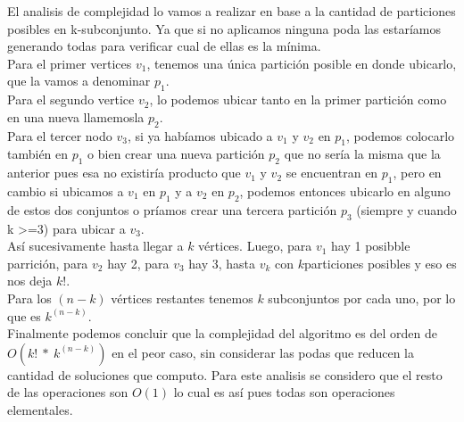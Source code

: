 El analisis de complejidad lo vamos a realizar en base a la cantidad de particiones posibles en k-subconjunto. Ya que si no aplicamos ninguna poda las estaríamos generando todas para verificar cual de ellas es la mínima.\\
Para el primer vertices $v_1$, tenemos una única partición posible en donde ubicarlo, que la vamos a denominar $p_1$.\\
Para el segundo vertice $v_2$, lo podemos ubicar tanto en la primer partición como en una nueva llamemosla $p_2$.\\
Para el tercer nodo $v_3$, si ya habíamos ubicado a $v_1$ y $v_2$ en $p_1$, podemos colocarlo tambi\'en en $p_1$ o bien crear una nueva partición $p_2$ que no sería la misma que la anterior pues esa no existiría producto que $v_1$ y $v_2$ se encuentran en $p_1$, pero en cambio si ubicamos a $v_1$ en $p_1$ y a $v_2$ en $p_2$, podemos entonces ubicarlo en alguno de estos dos conjuntos o príamos crear una tercera partición $p_3$ (siempre y cuando k >=3) para ubicar a $v_3$.\\

Así sucesivamente hasta llegar a $k$ vértices. Luego, para $v_1$ hay 1 posibble parrici\'on, para $v_2$ hay 2, para $v_3$ hay 3, hasta $v_k$ con $k$particiones posibles y eso es nos deja $k!$.\\

Para los $(n-k)$ v\'ertices restantes tenemos $k$ subconjuntos por cada uno, por lo que es $k^{(n-k)}$.\\


Finalmente podemos concluir que la complejidad del algoritmo es del orden de $O(k!\ *\ k^{(n-k)})$ en el peor caso, sin considerar las podas que reducen la cantidad de soluciones que computo. Para este analisis se considero que el resto de las operaciones son $O(1)$ lo cual es as\'i pues todas son operaciones elementales.